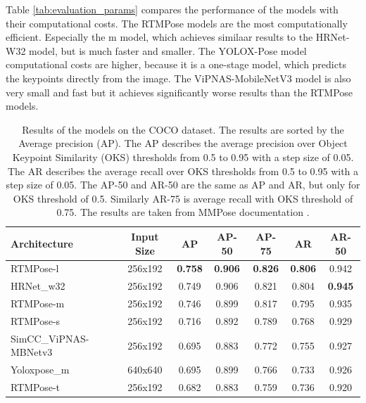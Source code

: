 Table \ref{tab:evaluation_params} compares the performance of the models with their computational costs. The RTMPose models are the most computationally efficient. Especially the m model, which achieves similaar results to the HRNet-W32 model, but is much faster and smaller. The YOLOX-Pose model computational costs are higher, because it is a one-stage model, which predicts the keypoints directly from the image. The ViPNAS-MobileNetV3 model is also very small and fast but it achieves significantly worse results than the RTMPose models.

\begin{table}[htbp]

    \centering
    \begin{tabular}{lcccccc}
        \toprule
        Architecture          & Input Size & AP             & AP-50          & AP-75          & AR             & AR-50          \\
        \midrule
        RTMPose-l             & 256x192    & \textbf{0.758} & \textbf{0.906} & \textbf{0.826} & \textbf{0.806} & 0.942          \\
        HRNet\_w32            & 256x192    & 0.749          & 0.906          & 0.821          & 0.804          & \textbf{0.945} \\
        RTMPose-m             & 256x192    & 0.746          & 0.899          & 0.817          & 0.795          & 0.935          \\
        RTMPose-s             & 256x192    & 0.716          & 0.892          & 0.789          & 0.768          & 0.929          \\
        SimCC\_ViPNAS-MBNetv3 & 256x192    & 0.695          & 0.883          & 0.772          & 0.755          & 0.927          \\
        Yoloxpose\_m          & 640x640    & 0.695          & 0.899          & 0.766          & 0.733          & 0.926          \\
        RTMPose-t             & 256x192    & 0.682          & 0.883          & 0.759          & 0.736          & 0.920          \\


        \bottomrule
    \end{tabular}
    \caption{Results of the models on the COCO dataset. The results are sorted by the Average precision (AP). The AP describes the average precision over Object Keypoint Similarity (OKS) thresholds from 0.5 to 0.95 with a step size of 0.05. The AR describes the average recall over OKS thresholds from 0.5 to 0.95 with a step size of 0.05. The AP-50 and AR-50 are the same as AP and AR, but only for OKS threshold of 0.5. Similarly AR-75 is average recall with OKS threshold of 0.75. The results are taken from MMPose documentation \cite{mmpose2020}.}
    \label{tab:evaluation_results_coco}

\end{table}

